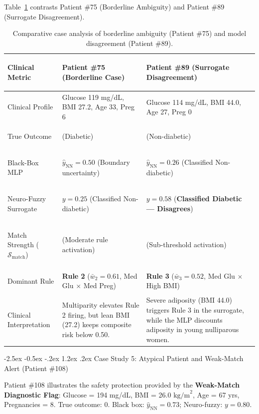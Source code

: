 \documentclass[12pt,a4paper,oneside]{report}
\makeatletter
\renewcommand\section{\@startsection {section}{1}{\z@}%
                                   {-2.5ex \@plus -0.5ex \@minus -.2ex}%
                                   {1.2ex \@plus .2ex}%
                                   {\normalfont\fontsize{13}{16}\selectfont\bfseries}}
\makeatother
\begin{document}
Table~\ref{tab:case_ambiguity_summary} contrasts Patient \#75 (Borderline Ambiguity) and Patient \#89 (Surrogate Disagreement).

\begin{table}[htbp]
\centering
\footnotesize
\renewcommand{\arraystretch}{0.80}
\begin{tabularx}{\textwidth}{>{\bfseries\raggedright\arraybackslash}p{2.6cm} >{\raggedright\arraybackslash}X >{\raggedright\arraybackslash}X}
\toprule
\textbf{Clinical Metric} & \textbf{Patient \#75 (Borderline Case)} & \textbf{Patient \#89 (Surrogate Disagreement)} \\
\midrule
Clinical Profile & Glucose 119 mg/dL, BMI 27.2, Age 33, Preg 6 & Glucose 114 mg/dL, BMI 44.0, Age 27, Preg 0 \\
True Outcome & 1 (Diabetic) & 0 (Non-diabetic) \\
Black-Box MLP & $\hat{y}_{\text{NN}} = \mathbf{0.50}$ (Boundary uncertainty) & $\hat{y}_{\text{NN}} = \mathbf{0.26}$ (Classified Non-diabetic) \\
Neuro-Fuzzy Surrogate & $y = \mathbf{0.25}$ (Classified Non-diabetic) & $y = \mathbf{0.58}$ (\textbf{Classified Diabetic --- Disagrees}) \\
Match Strength ($\mathcal{S}_{\text{match}}$) & 0.62 (Moderate rule activation) & 0.38 (Sub-threshold activation) \\
Dominant Rule & \textbf{Rule 2} ($\bar{w}_2 = 0.61$, Med Glu $\times$ Med Preg) & \textbf{Rule 3} ($\bar{w}_3 = 0.52$, Med Glu $\times$ High BMI) \\
\midrule
Clinical Interpretation & Multiparity elevates Rule 2 firing, but lean BMI (27.2) keeps composite risk below 0.50. & Severe adiposity (BMI 44.0) triggers Rule 3 in the surrogate, while the MLP discounts adiposity in young nulliparous women. \\
\bottomrule
\end{tabularx}
\caption[Comparative Ambiguity and Disagreement Analysis]{Comparative case analysis of borderline ambiguity (Patient \#75) and model disagreement (Patient \#89).}
\label{tab:case_ambiguity_summary}
\end{table}

\section{Case Study 5: Atypical Patient and Weak-Match Alert (Patient \#108)}

Patient \#108 illustrates the safety protection provided by the \textbf{Weak-Match Diagnostic Flag}: Glucose = 194 mg/dL, BMI = 26.0 $\text{kg/m}^2$, Age = 67 yrs, Pregnancies = 8. True outcome: 0. Black box: $\hat{y}_{\text{NN}} = 0.73$; Neuro-fuzzy: $y = 0.80$.
\end{document}
